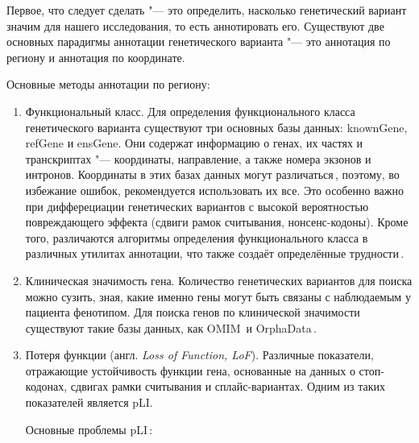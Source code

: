 \documentclass[a4paper,14pt]{extarticle}
\newcommand{\ecitep}[1]{\textenglish{\citep{#1}}}
\newcommand{\engterm}[1]{англ. \textenglish{\textit{#1}}}
\begin{document}
Первое, что следует сделать "--- это определить, насколько генетический вариант значим для нашего исследования, то есть аннотировать его.
Существуют две основных парадигмы аннотации генетического варианта "--- это аннотация по региону и аннотация по координате.

Основные методы аннотации по региону:

\begin{enumerate}
	\item Функциональный класс.
	 Для определения функционального класса генетического варианта существуют три основных базы данных: knownGe\-ne, refGene и ensGene.
	 Они содержат информацию о генах, их частях и транскриптах "--- координаты, направление, а также номера экзонов и интронов.
	 Координаты в этих базах данных могут различаться\,\ecitep{McCarthy_2014}, поэтому, во избежание ошибок, рекомендуется использовать их все.
	 Это особенно важно при дифферециации генетических вариантов с высокой вероятностью повреждающего эффекта (сдвиги рамок считывания, нонсенс-кодоны).
	 Кроме того, различаются алгоритмы определения функционального класса в различных утилитах аннотации, что также создаёт определённые трудности\,\ecitep{Jesaitis_2014}.

	\item Клиническая значимость гена.
	 Количество генетических вариантов для поиска можно сузить, зная, какие именно гены могут быть связаны с наблюдаемым у пациента фенотипом.
	 Для поиска генов по клинической значимости существуют такие базы данных, как OMIM\,\ecitep{Amberger_2014} и OrphaData\,\ecitep{Orphanet}.

	\item Потеря функции (\engterm{Loss of Function, LoF}).
	 Различные показатели, отражающие устойчивость функции гена, основанные на данных о стоп-кодонах, сдвигах рамки считывания и сплайс-вариантах.
	 Одним из таких показателей является pLI.

	 Основные проблемы pLI\,\ecitep{Ziegler_2019}:


\end{enumerate}
\end{document}

